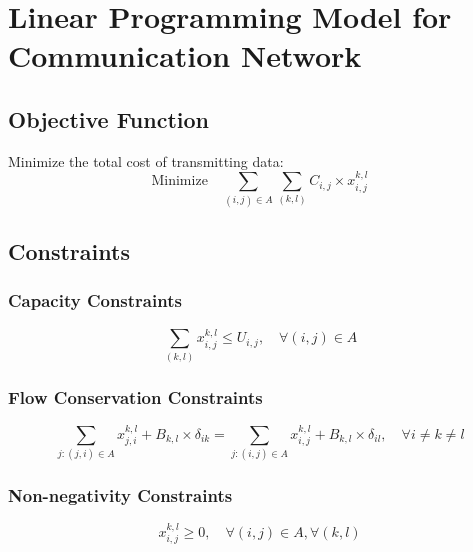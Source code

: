 \documentclass{article}
\begin{document}
\section*{Linear Programming Model for Communication Network}

\subsection*{Objective Function}
Minimize the total cost of transmitting data:
\[
\text{Minimize} \quad \sum_{(i,j) \in A} \sum_{(k,l)} C_{i,j} \times x_{i,j}^{k,l}
\]

\subsection*{Constraints}

\subsubsection*{Capacity Constraints}
\[
\sum_{(k,l)} x_{i,j}^{k,l} \leq U_{i,j}, \quad \forall (i,j) \in A
\]

\subsubsection*{Flow Conservation Constraints}
\[
\sum_{j: (j,i) \in A} x_{j,i}^{k,l} + B_{k,l} \times \delta_{ik} = \sum_{j: (i,j) \in A} x_{i,j}^{k,l} + B_{k,l} \times \delta_{il}, \quad \forall i \neq k \neq l
\]

\subsubsection*{Non-negativity Constraints}
\[
x_{i,j}^{k,l} \geq 0, \quad \forall (i,j) \in A, \forall (k,l)
\]
\end{document}
